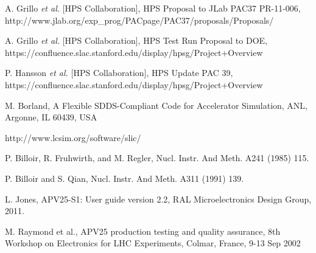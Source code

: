 \begin{thebibliography}{99}


 A. Grillo {\it et al.} [HPS Collaboration], HPS Proposal to JLab PAC37 PR-11-006,
 http://www.jlab.org/exp\_prog/PACpage/PAC37/proposals/Proposals/

 A. Grillo {\it et al.} [HPS Collaboration], HPS Test Run Proposal to DOE, 
https://confluence.slac.stanford.edu/display/hpsg/Project+Overview

 P. Hansson {\it et al.} [HPS Collaboration], HPS Update PAC 39, 
https://confluence.slac.stanford.edu/display/hpsg/Project+Overview



 



 M. Borland, A Flexible SDDS-Compliant Code for Accelerator Simulation, ANL, Argonne, IL 60439, USA
 
  http://www.lcsim.org/software/slic/
 
 P. Billoir, R. Fruhwirth, and M. Regler, Nucl. Instr. And Meth. A241 (1985) 115. 

 P. Billoir and S. Qian, Nucl. Instr. And Meth. A311 (1991) 139. 

 L. Jones, APV25-S1: User guide version 2.2, RAL Microelectronics Design Group, 2011.

 M. Raymond et al., APV25 production testing and quality assurance, 8th Workshop on Electronics for LHC
	              Experiments, Colmar, France, 9-13 Sep 2002
	               


\end{thebibliography} 
